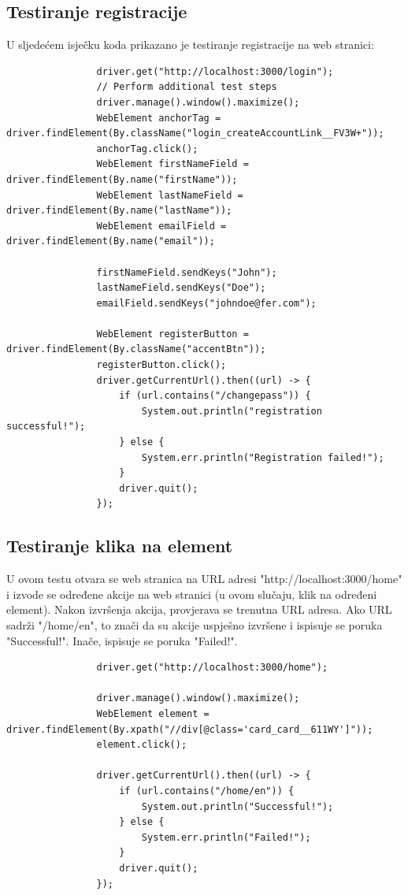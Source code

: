 			\subsection{Testiranje registracije}

			U sljedećem isječku koda prikazano je testiranje registracije na web stranici:
			
			\begin{lstlisting}
				driver.get("http://localhost:3000/login");
				// Perform additional test steps
				driver.manage().window().maximize();
				WebElement anchorTag = driver.findElement(By.className("login_createAccountLink__FV3W+"));
				anchorTag.click();
				WebElement firstNameField = driver.findElement(By.name("firstName"));
				WebElement lastNameField = driver.findElement(By.name("lastName"));
				WebElement emailField = driver.findElement(By.name("email"));
		
				firstNameField.sendKeys("John");
				lastNameField.sendKeys("Doe");
				emailField.sendKeys("johndoe@fer.com");
				
				WebElement registerButton = driver.findElement(By.className("accentBtn"));
				registerButton.click();
				driver.getCurrentUrl().then((url) -> {
					if (url.contains("/changepass")) {
						System.out.println("registration successful!");
					} else {
						System.err.println("Registration failed!");
					}
					driver.quit();        
				});
			\end{lstlisting}

			\subsection{Testiranje klika na element}

			U ovom testu otvara se web stranica na URL adresi "http://localhost:3000/home" i izvode se određene akcije na web stranici (u ovom slučaju, klik na određeni element). Nakon izvršenja akcija, provjerava se trenutna URL adresa. Ako URL sadrži "/home/en", to znači da su akcije uspješno izvršene i ispisuje se poruka "Successful!". Inače, ispisuje se poruka "Failed!".

			\begin{lstlisting}
				driver.get("http://localhost:3000/home");

				driver.manage().window().maximize();
				WebElement element = driver.findElement(By.xpath("//div[@class='card_card__611WY']"));
				element.click();
		
				driver.getCurrentUrl().then((url) -> {
					if (url.contains("/home/en")) {
						System.out.println("Successful!");
					} else {
						System.err.println("Failed!");
					}
					driver.quit();
				});
			\end{lstlisting}

